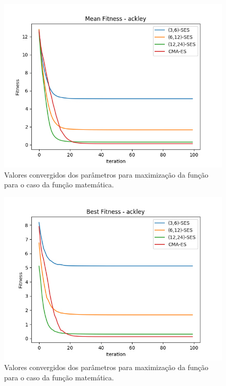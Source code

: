\documentclass[conference]{IEEEtran}
\begin{document}
\begin{figure}[htbp]
\centering
\centerline{\includegraphics[scale=0.4]{imagens/ackley/mean_fitness.png}}
\caption{Valores convergidos dos parâmetros para maximização da função para o caso da função matemática.}
\label{ackley/mean_fitness}
\end{figure}

\begin{figure}[htbp]
\centering
\centerline{\includegraphics[scale=0.4]{imagens/ackley/best_fitness.png}}
\caption{Valores convergidos dos parâmetros para maximização da função para o caso da função matemática.}
\label{ackley/best_fitness}
\end{figure}
\end{document}
